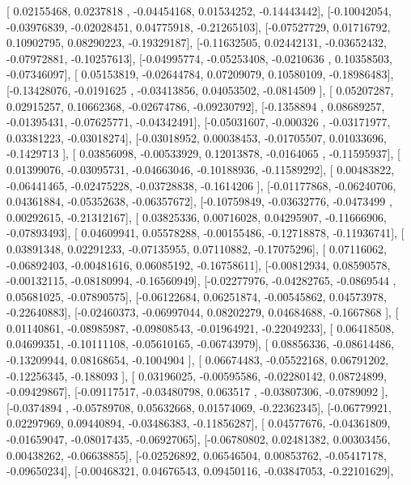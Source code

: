 \documentclass{article}
\begin{document}
       [ 0.02155468,  0.0237818 , -0.04454168,  0.01534252, -0.14443442],
       [-0.10042054, -0.03976839, -0.02028451,  0.04775918, -0.21265103],
       [-0.07527729,  0.01716792,  0.10902795,  0.08290223, -0.19329187],
       [-0.11632505,  0.02442131, -0.03652432, -0.07972881, -0.10257613],
       [-0.04995774, -0.05253408, -0.0210636 ,  0.10358503, -0.07346097],
       [ 0.05153819, -0.02644784,  0.07209079,  0.10580109, -0.18986483],
       [-0.13428076, -0.0191625 , -0.03413856,  0.04053502, -0.0814509 ],
       [ 0.05207287,  0.02915257,  0.10662368, -0.02674786, -0.09230792],
       [-0.1358894 ,  0.08689257, -0.01395431, -0.07625771, -0.04342491],
       [-0.05031607, -0.000326  , -0.03171977,  0.03381223, -0.03018274],
       [-0.03018952,  0.00038453, -0.01705507,  0.01033696, -0.1429713 ],
       [ 0.03856098, -0.00533929,  0.12013878, -0.0164065 , -0.11595937],
       [ 0.01399076, -0.03095731, -0.04663046, -0.10188936, -0.11589292],
       [ 0.00483822, -0.06441465, -0.02475228, -0.03728838, -0.1614206 ],
       [-0.01177868, -0.06240706,  0.04361884, -0.05352638, -0.06357672],
       [-0.10759849, -0.03632776, -0.0473499 ,  0.00292615, -0.21312167],
       [ 0.03825336,  0.00716028,  0.04295907, -0.11666906, -0.07893493],
       [ 0.04609941,  0.05578288, -0.00155486, -0.12718878, -0.11936741],
       [ 0.03891348,  0.02291233, -0.07135955,  0.07110882, -0.17075296],
       [ 0.07116062, -0.06892403, -0.00481616,  0.06085192, -0.16758611],
       [-0.00812934,  0.08590578, -0.00132115, -0.08180994, -0.16560949],
       [-0.02277976, -0.04282765, -0.0869544 ,  0.05681025, -0.07890575],
       [-0.06122684,  0.06251874, -0.00545862,  0.04573978, -0.22640883],
       [-0.02460373, -0.06997044,  0.08202279,  0.04684688, -0.1667868 ],
       [ 0.01140861, -0.08985987, -0.09808543, -0.01964921, -0.22049233],
       [ 0.06418508,  0.04699351, -0.10111108, -0.05610165, -0.06743979],
       [ 0.08856336, -0.08614486, -0.13209944,  0.08168654, -0.1004904 ],
       [ 0.06674483, -0.05522168,  0.06791202, -0.12256345, -0.188093  ],
       [ 0.03196025, -0.00595586, -0.02280142,  0.08724899, -0.09429867],
       [-0.09117517, -0.03480798,  0.063517  , -0.03807306, -0.0789092 ],
       [-0.0374894 , -0.05789708,  0.05632668,  0.01574069, -0.22362345],
       [-0.06779921,  0.02297969,  0.09440894, -0.03486383, -0.11856287],
       [ 0.04577676, -0.04361809, -0.01659047, -0.08017435, -0.06927065],
       [-0.06780802,  0.02481382,  0.00303456,  0.00438262, -0.06638855],
       [-0.02526892,  0.06546504,  0.00853762, -0.05417178, -0.09650234],
       [-0.00468321,  0.04676543,  0.09450116, -0.03847053, -0.22101629],
\end{document}
